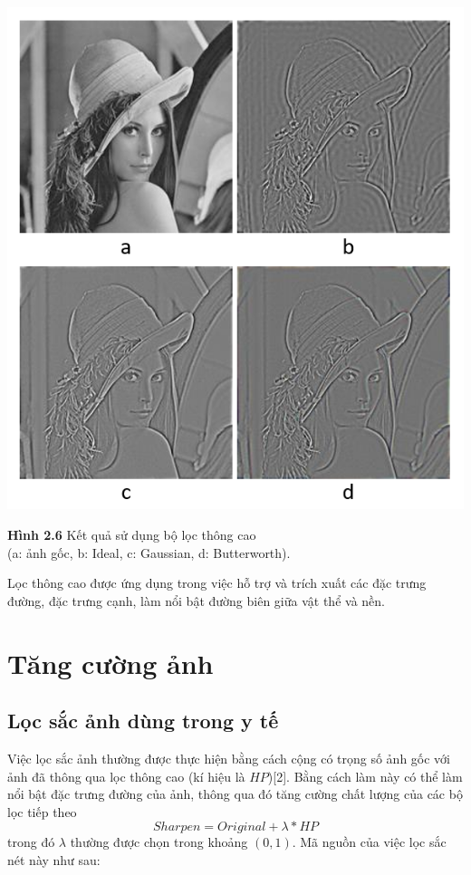 \begin{center}
    \includegraphics[scale=1.0]{Figures/fig10.png}
    \par \textbf {Hình 2.6} Kết quả sử dụng bộ lọc thông cao\\ (a: ảnh gốc, b: Ideal, c: Gaussian, d: Butterworth).
\end{center}
\par Lọc thông cao được ứng dụng trong việc hỗ trợ và trích xuất các đặc trưng đường, đặc trưng cạnh, làm nổi bật đường biên giữa vật thể và nền.

\section{Tăng cường ảnh}
\subsection{Lọc sắc ảnh dùng trong y tế}
Việc lọc sắc ảnh thường được thực hiện bằng cách cộng có trọng số ảnh gốc với ảnh đã thông qua lọc thông cao (kí hiệu là $HP$)[2]. Bằng cách làm này có thể làm nổi bật đặc trưng đường của ảnh, thông qua đó tăng cường chất lượng của các bộ lọc tiếp theo
$$Sharpen = Original + \lambda * HP$$
trong đó $\lambda$ thường được chọn trong khoảng $(0, 1)$. Mã nguồn của việc lọc sắc nét này như sau:

